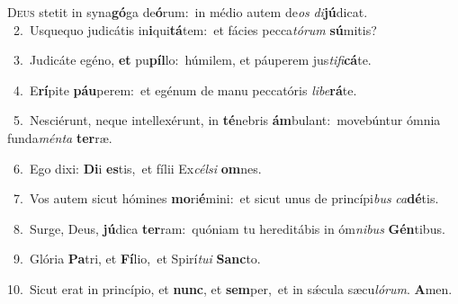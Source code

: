 \lettrine{\initial\textcolor{\initialcolor}{D}}{eus} stetit in syna\-\textbf{gó}\-ga de\-\textbf{ó}\-rum:~\star in médio autem de\textit{os} \textit{di}\-\textbf{jú}dicat.\\
{\numbfont\textcolor{\numbcolor}{~2.}}~Usquequo judicátis in\-\textbf{i}\-qui\-\textbf{tá}\-tem:~\star et fácies pecca\-\textit{tó}\-\textit{rum} \textbf{sú}\-mitis?\par
{\numbfont\textcolor{\numbcolor}{~3.}}~Judicáte egéno, \textbf{et} pu\-\textbf{píl}\-lo:~\star húmilem, et páuperem jus\-\textit{ti}\-\textit{fi}\textbf{cá}te.\par
{\numbfont\textcolor{\numbcolor}{~4.}}~E\-\textbf{rí}\-pite \textbf{páu}\-perem:~\star et egénum de manu peccatóris \textit{li}\-\textit{be}\textbf{rá}te.\par
{\numbfont\textcolor{\numbcolor}{~5.}}~Nesciérunt, neque intellexérunt, in \textbf{té}\-nebris \textbf{ám}\-bulant:~\star movebúntur ómnia funda\-\textit{mén}\-\textit{ta} \textbf{ter}\-ræ.\par
{\numbfont\textcolor{\numbcolor}{~6.}}~Ego dixi: \textbf{Di}\-i \textbf{es}\-tis,~\star et fílii Ex\-\textit{cél}\-\textit{si} \textbf{om}\-nes.\par
{\numbfont\textcolor{\numbcolor}{~7.}}~Vos autem sicut hómines \textbf{mo}\-ri\-\textbf{é}\-mini:~\star et sicut unus de princípi\textit{bus} \textit{ca}\-\textbf{dé}tis.\par
{\numbfont\textcolor{\numbcolor}{~8.}}~Surge, Deus, \textbf{jú}\-dica \textbf{ter}\-ram:~\star quóniam tu hereditábis in óm\-\textit{ni}\-\textit{bus} \textbf{Gén}\-tibus.\par
{\numbfont\textcolor{\numbcolor}{~9.}}~Glória \textbf{Pa}\-tri, et \textbf{Fí}\-lio,~\star et Spirí\-\textit{tu}\-\textit{i} \textbf{Sanc}\-to.\par
{\numbfont\textcolor{\numbcolor}{10.}}~Sicut erat in princípio, et \textbf{nunc}\-, et \textbf{sem}\-per,~\star et in sǽcula sæcu\-\textit{ló}\-\textit{rum}. \textbf{A}\-men.\par

